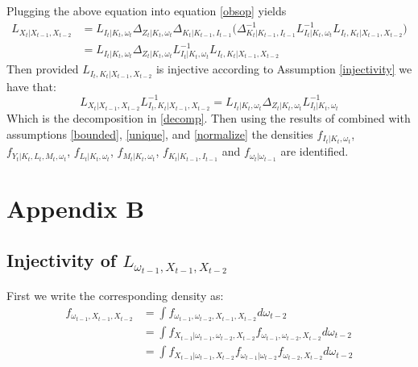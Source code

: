 \documentclass{article}
\begin{document}
Plugging the above equation into equation \eqref{obsop} yields
\begin{equation*}
\begin{split}
L_{X_{t}|X_{t-1}, X_{t-2}}&=L_{I_{t}|K_{t}, \omega_{t}}\Delta_{Z_{t}|K_{t}, \omega_{t}}\Delta_{K_{t}|K_{t-1}, I_{t-1}}\Bigg(\Delta^{-1}_{K_{t}|K_{t-1}, I_{t-1}}L^{-1}_{I_{t}|K_{t}, \omega_{t}}L_{I_{t}, K_{t}|X_{t-1}, X_{t-2}}\Bigg)\\
&=L_{I_{t}|K_{t}, \omega_{t}}\Delta_{Z_{t}|K_{t}, \omega_{t}}L^{-1}_{I_{t}|K_{t}, \omega_{t}}L_{I_{t}, K_{t}|X_{t-1}, X_{t-2}}
\end{split}
\end{equation*}
Then provided $L_{I_{t}, K_{t}|X_{t-1}, X_{t-2}}$ is injective according to Assumption \eqref{injectivity} we have that:
\begin{equation*}
L_{X_{t}|X_{t-1}, X_{t-2}}L^{-1}_{I_{t}, K_{t}|X_{t-1}, X_{t-2}}=L_{I_{t}|K_{t}, \omega_{t}}\Delta_{Z_{t}|K_{t}, \omega_{t}}L^{-1}_{I_{t}|K_{t}, \omega_{t}}
\end{equation*}
Which is the decomposition in \eqref{decomp}. Then using the results of \cite{Hu2008} combined with assumptions \eqref{bounded}, \eqref{unique}, and \eqref{normalize} the densities $f_{I_{t}|K_{t}, \omega_{t}}$, $f_{Y_{t}|K_{t}, L_{t}, M_{t}, \omega_{t}}$, $f_{L_{t}|K_{t}, \omega_{t}}$, $f_{M_{t}|K_{t}, \omega_{t}}$, $f_{K_{t}|K_{t-1}, I_{t-1}}$ and $f_{\omega_{t}|\omega_{t-1}}$ are identified.

\section*{Appendix B}
\subsection*{Injectivity of $L_{\omega_{t-1}, X_{t-1}, X_{t-2}}$}
First we write the corresponding density as:
\begin{equation*}
\begin{split}
f_{\omega_{t-1}, X_{t-1}, X_{t-2}}&=\int f_{\omega_{t-1}, \omega_{t-2}, X_{t-1}, X_{t-2}}d\omega_{t-2}\\
&=\int f_{X_{t-1}|\omega_{t-1}, \omega_{t-2}, X_{t-2}}f_{\omega_{t-1}, \omega_{t-2}, X_{t-2}}d\omega_{t-2}\\
&=\int f_{X_{t-1}|\omega_{t-1}, X_{t-2}}f_{\omega_{t-1}|\omega_{t-2}}f_{\omega_{t-2}, X_{t-2}}d\omega_{t-2}\\
\end{split}
\end{equation*}
\end{document}
